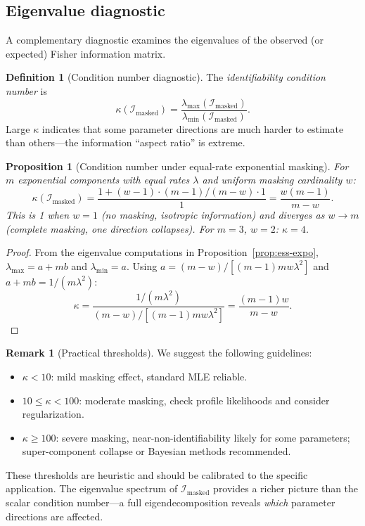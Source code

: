 \documentclass[11pt]{article}
\theoremstyle{definition}
\newtheorem{definition}{Definition}
\newtheorem{remark}{Remark}
\theoremstyle{plain}
\newtheorem{proposition}{Proposition}
\newcommand{\FI}{\mathcal{I}}       %
\begin{document}
\subsection{Eigenvalue diagnostic}

A complementary diagnostic examines the eigenvalues of the observed
(or expected) Fisher information matrix.

\begin{definition}[Condition number diagnostic]
\label{def:condition-diagnostic}
The \emph{identifiability condition number} is
\begin{equation}
    \kappa(\FI_{\mathrm{masked}})
    = \frac{\lambda_{\max}(\FI_{\mathrm{masked}})}
           {\lambda_{\min}(\FI_{\mathrm{masked}})}.
\end{equation}
Large $\kappa$ indicates that some parameter directions are much
harder to estimate than others---the information ``aspect ratio''
is extreme.
\end{definition}

\begin{proposition}[Condition number under equal-rate exponential masking]
\label{prop:condition-expo}
For $m$ exponential components with equal rates $\lambda$ and
uniform masking cardinality $w$:
\begin{equation}
    \kappa(\FI_{\mathrm{masked}})
    = \frac{1 + (w-1) \cdot (m-1)/(m-w) \cdot 1}{1}
    = \frac{w(m-1)}{m - w}.
\end{equation}
This is 1 when $w = 1$ (no masking, isotropic information) and
diverges as $w \to m$ (complete masking, one direction collapses).
For $m = 3$, $w = 2$: $\kappa = 4$.
\end{proposition}

\begin{proof}
From the eigenvalue computations in Proposition~\ref{prop:ess-expo},
$\lambda_{\max} = a + mb$ and $\lambda_{\min} = a$.
Using $a = (m-w)/[(m-1)mw\lambda^2]$ and
$a + mb = 1/(m\lambda^2)$:
\begin{equation}
    \kappa = \frac{1/(m\lambda^2)}{(m-w)/[(m-1)mw\lambda^2]}
    = \frac{(m-1)w}{m-w}.
\end{equation}
\end{proof}

\begin{remark}[Practical thresholds]
\label{rem:thresholds}
We suggest the following guidelines:
\begin{itemize}[nosep]
    \item $\kappa < 10$: mild masking effect, standard MLE reliable.
    \item $10 \leq \kappa < 100$: moderate masking, check profile
    likelihoods and consider regularization.
    \item $\kappa \geq 100$: severe masking, near-non-identifiability
    likely for some parameters; super-component collapse or Bayesian
    methods recommended.
\end{itemize}
These thresholds are heuristic and should be calibrated to the
specific application.
The eigenvalue spectrum of $\FI_{\mathrm{masked}}$ provides a richer
picture than the scalar condition number---a full eigendecomposition
reveals \emph{which} parameter directions are affected.
\end{remark}
\end{document}
